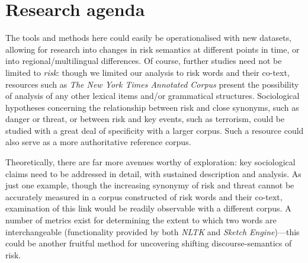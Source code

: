
\section{Research agenda}

The tools and methods here could easily be operationalised with new datasets, allowing for research into changes in risk semantics at different points in time, or into regional\slash multilingual differences. Of course, further studies need not be limited to \emph{risk}: though we limited our analysis to risk words and their co-text, resources such as \emph{The New York Times Annotated Corpus} \cite{sandhaus_new_2008} present the possibility of analysis of any other lexical items and\slash or grammatical structures. Sociological hypotheses concerning the relationship between risk and close synonyms, such as danger or threat, or between risk and key events, such as terrorism, could be studied with a great deal of specificity with a larger corpus. Such a resource could also serve as a more authoritative reference corpus.

Theoretically, there are far more avenues worthy of exploration: key sociological claims need to be addressed in detail, with sustained description and analysis. As just one example, though the increasing synonymy of risk and threat cannot be accurately measured in a corpus constructed of risk words and their co-text, examination of this link would be readily observable with a different corpus. A number of metrics exist for determining the extent to which two words are interchangeable (functionality provided by both \emph{NLTK} and \emph{Sketch Engine})---this could be another fruitful method for uncovering shifting discourse-semantics of risk.


